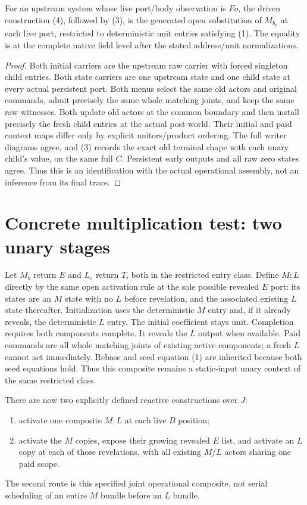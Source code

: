 \documentclass[11pt]{article}\usepackage{amsmath,amssymb,amsthm,geometry}\geometry{margin=1in}
\begin{document}
\begin{theorem}
For an upstream system whose live port/body observation is $F o$, the driven construction (4), followed by (3), is the generated open substitution of $M_{b_p}$ at each live port, restricted to deterministic unit entries satisfying (1). The equality is at the complete native field level after the stated address/unit normalizations.
\end{theorem}
\begin{proof}
Both initial carriers are the upstream raw carrier with forced singleton child entries. Both state carriers are one upstream state and one child state at every actual persistent port. Both menus select the same old actors and original commands, admit precisely the same whole matching joints, and keep the same raw witnesses. Both update old actors at the common boundary and then install precisely the fresh child entries at the actual post-world. Their initial and paid context maps differ only by explicit unitors/product ordering. The full writer diagrams agree, and (3) records the exact old terminal shape with each unary child's value, on the same full $C$. Persistent early outputs and all raw zero states agree. Thus this is an identification with the actual operational assembly, not an inference from its final trace.\end{proof}

\section{Concrete multiplication test: two unary stages}
Let $M_b$ return $E$ and $L_e$ return $T$, both in the restricted entry class. Define $M;L$ directly by the same open activation rule at the sole possible revealed $E$ port: its states are an $M$ state with no $L$ before revelation, and the associated existing $L$ state thereafter. Initialization uses the deterministic $M$ entry and, if it already reveals, the deterministic $L$ entry. The initial coefficient stays unit. Completion requires both components complete. It reveals the $L$ output when available. Paid commands are all whole matching joints of existing active components; a fresh $L$ cannot act immediately. Rebase and seed equation (1) are inherited because both seed equations hold. Thus this composite remains a static-input unary context of the same restricted class.

There are now two explicitly defined reactive constructions over $J$:
\begin{enumerate}
\item activate one composite $M;L$ at each live $B$ position;
\item activate the $M$ copies, expose their growing revealed $E$ list, and activate an $L$ copy at each of those revelations, with all existing $M/L$ actors sharing one paid scope.
\end{enumerate}
The second route is this specified joint operational composite, not serial scheduling of an entire $M$ bundle before an $L$ bundle.
\end{document}
